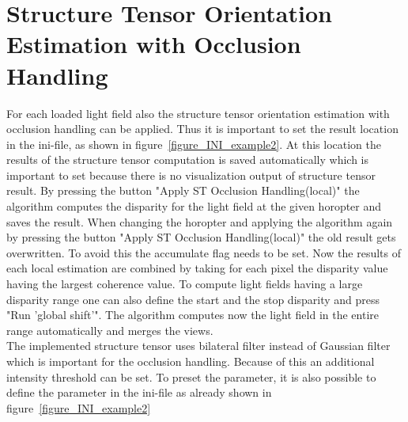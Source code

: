 \section{Structure Tensor Orientation Estimation with Occlusion Handling}
%
For each loaded light field also the structure tensor orientation estimation with occlusion handling can be applied. 
%
Thus it is important to set the result location in the ini-file, as shown in figure~\ref{figure_INI_example2}.
%
At this location the results of the structure tensor computation is saved automatically which is important to set because there is no visualization output of structure tensor result.
%
By pressing the button "Apply ST Occlusion Handling(local)" the algorithm computes the disparity for the light field at the given horopter and saves the result.
%
When changing the horopter and applying the algorithm again by pressing the button "Apply ST Occlusion Handling(local)" the old result gets overwritten.
%
To avoid this the accumulate flag needs to be set.
%
Now the results of each local estimation are combined by taking for each pixel the disparity value having the largest coherence value.
%
To compute light fields having a large disparity range one can also define the start and the stop disparity and press "Run 'global shift'".
%
The algorithm computes now the light field in the entire range automatically and merges the views.\\
%
The implemented structure tensor uses bilateral filter instead of Gaussian filter which is important for the occlusion handling.
%
Because of this an additional intensity threshold can be set.
%
To preset the parameter, it is also possible to define the parameter in the ini-file as already shown in figure~\ref{figure_INI_example2}\\
%

%
\newpage
%
